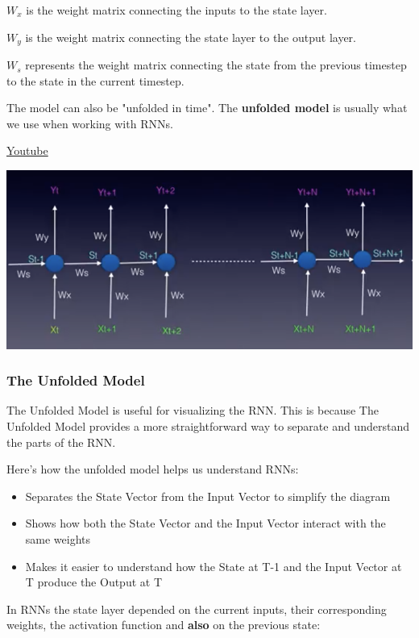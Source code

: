  \(W_x\) is the weight matrix connecting the inputs to the state layer. \newline

\(W_y\) is the weight matrix connecting the state layer to the output layer. \newline

\(W_s\) represents the weight matrix connecting the state from the previous timestep to the state in the current timestep. \newline

The model can also be "unfolded in time". The \textbf{unfolded model} is usually what we use when working with RNNs. \newline

\href{https://www.youtube.com/watch?v=xLIA_PTWXog&ab_channel=Udacity}{Youtube} \newline

\includegraphics[width=01\linewidth]{img//rnn//intro/screen-shot-2017-11-06-at-2.38.51-pm.png}


\subsubsection{The Unfolded Model}

The Unfolded Model is useful for visualizing the RNN. This is because The Unfolded Model provides a more straightforward way to separate and understand the parts of the RNN. \newline

Here's how the unfolded model helps us understand RNNs:

\begin{itemize}
    \item Separates the State Vector from the Input Vector to simplify the diagram
    \item Shows how both the State Vector and the Input Vector interact with the same weights
    \item Makes it easier to understand how the State at T-1 and the Input Vector at T produce the Output at T
\end{itemize}
In RNNs the state layer depended on the current inputs, their corresponding weights, the activation function and \textbf{also} on the previous state:

